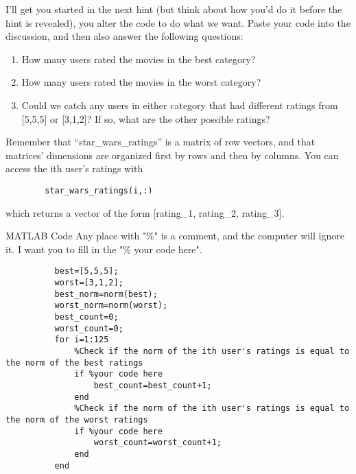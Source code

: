 \documentclass{ximera}
\begin{document}
\begin{exploration}
    I'll get you started in the next hint (but think about how you'd do it before the hint is revealed), you alter the code to do what we want. Paste your code into the discussion, and then also answer the following questions:

    \begin{enumerate}

      \item How many users rated the movies in the best category?
      \item How many users rated the movies in the worst category?
      \item Could we catch any users in either category that had different ratings from [5,5,5] or [3,1,2]? If so, what are the other possible ratings?
      
    \end{enumerate}

    \begin{remark}

      Remember that ``star\_wars\_ratings'' is a matrix of row vectors, and that matrices' dimensions are organized first by rows and then by columns. You can access the ith user's ratings with 
      \begin{verbatim}
        star_wars_ratings(i,:)
      \end{verbatim}
      
      which returns a vector of the form [rating\_1, rating\_2, rating\_3].

    \end{remark}

    \begin{hint}{MATLAB Code}
      Any place with "\%" is a comment, and the computer will ignore it. I want you to fill in the "\% your code here".

      \begin{verbatim}
          best=[5,5,5];
          worst=[3,1,2];
          best_norm=norm(best);
          worst_norm=norm(worst);
          best_count=0;
          worst_count=0;
          for i=1:125
              %Check if the norm of the ith user's ratings is equal to the norm of the best ratings
              if %your code here
                  best_count=best_count+1;
              end
              %Check if the norm of the ith user's ratings is equal to the norm of the worst ratings
              if %your code here
                  worst_count=worst_count+1;
              end
          end
      \end{verbatim}
    \end{hint}
  \end{exploration}
\end{document}
